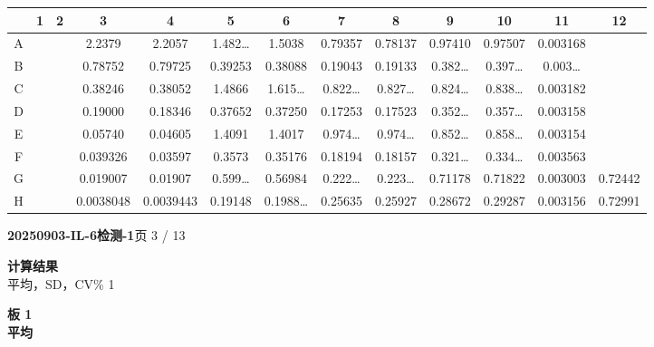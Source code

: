 \documentclass[UTF8,10pt,a4paper,fontset=fandol]{ctexart}
\begin{document}
\begin{center}
\scriptsize
\begin{tabular}{c|*{12}{c}}
 & 1 & 2 & 3 & 4 & 5 & 6 & 7 & 8 & 9 & 10 & 11 & 12\\
\hline
A &
 & &
2.2379 &
2.2057 &
1.482\ldots &
1.5038 &
0.79357 &
0.78137 &
0.97410 &
0.97507 &
0.003168 &
\\
B &
 & &
0.78752 &
0.79725 &
0.39253 &
0.38088 &
0.19043 &
0.19133 &
0.382\ldots &
0.397\ldots &
0.003\ldots &
\\
C &
 & &
0.38246 &
0.38052 &
1.4866 &
1.615\ldots &
0.822\ldots &
0.827\ldots &
0.824\ldots &
0.838\ldots &
0.003182 &
\\
D &
 & &
0.19000 &
0.18346 &
0.37652 &
0.37250 &
0.17253 &
0.17523 &
0.352\ldots &
0.357\ldots &
0.003158 &
\\
E &
 & &
0.05740 &
0.04605 &
1.4091 &
1.4017 &
0.974\ldots &
0.974\ldots &
0.852\ldots &
0.858\ldots &
0.003154 &
\\
F &
 & &
0.039326 &
0.03597 &
0.3573 &
0.35176 &
0.18194 &
0.18157 &
0.321\ldots &
0.334\ldots &
0.003563 &
\\
G &
 & &
0.019007 &
0.01907 &
0.599\ldots &
0.56984 &
0.222\ldots &
0.223\ldots &
0.71178 &
0.71822 &
0.003003 &
0.72442
\\
H &
 & &
0.0038048 &
0.0039443 &
0.19148 &
0.1988\ldots &
0.25635 &
0.25927 &
0.28672 &
0.29287 &
0.003156 &
0.72991
\end{tabular}
\end{center}


\newpage

\noindent\textbf{20250903-IL-6检测-1}\hfill 页 3 / 13

\medskip
\noindent\textbf{计算结果}\\
\hspace*{1em}平均，SD，CV\% 1

\medskip
\noindent\textbf{板 1}\\
\noindent\textbf{平均}
\end{document}
